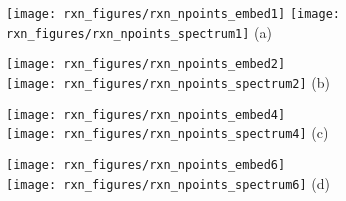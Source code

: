 \documentclass[]{article}
\begin{document}
\centering
\begin{minipage}{0.22\textwidth}
\centering
\texttt{[image: rxn\_figures/rxn\_npoints\_embed1]}
\texttt{[image: rxn\_figures/rxn\_npoints\_spectrum1]}
(a)
\end{minipage}
\hfill
\begin{minipage}{0.22\textwidth}
\centering
\texttt{[image: rxn\_figures/rxn\_npoints\_embed2]}\\
\texttt{[image: rxn\_figures/rxn\_npoints\_spectrum2]}
(b)
\end{minipage}
\hfill
\begin{minipage}{0.22\textwidth}
\centering
\texttt{[image: rxn\_figures/rxn\_npoints\_embed4]}\\
\texttt{[image: rxn\_figures/rxn\_npoints\_spectrum4]}
(c)
\end{minipage}
\hfill
\begin{minipage}{0.22\textwidth}
\centering
\texttt{[image: rxn\_figures/rxn\_npoints\_embed6]}\\
\texttt{[image: rxn\_figures/rxn\_npoints\_spectrum6]}
(d)
\end{minipage}
\end{document}
